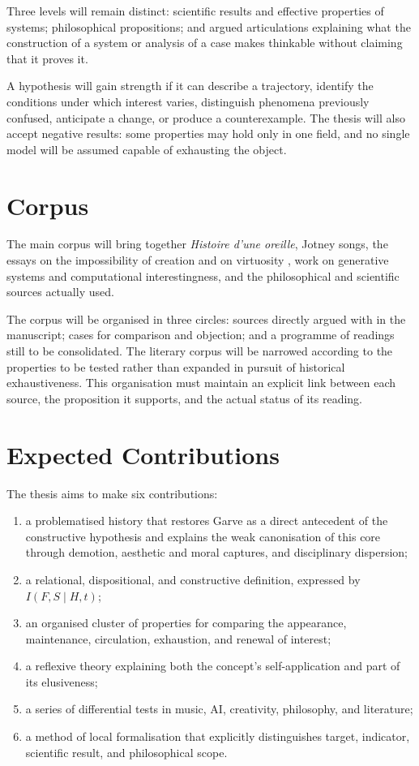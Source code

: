 \documentclass[11pt,a4paper]{article}
\begin{document}
Three levels will remain distinct: scientific results and effective properties
of systems; philosophical propositions; and argued articulations explaining
what the construction of a system or analysis of a case makes thinkable without
claiming that it proves it.

A hypothesis will gain strength if it can describe a trajectory, identify the
conditions under which interest varies, distinguish phenomena previously
confused, anticipate a change, or produce a counterexample. The thesis will also
accept negative results: some properties may hold only in one field, and no
single model will be assumed capable of exhausting the object.

\section{Corpus}

The main corpus will bring together \emph{Histoire d'une oreille}, Jotney songs,
the essays on the impossibility of creation and on virtuosity
\parencite{pachet2018oreille,pachet2026impossibilite,pachet2027virtuosite}, work
on generative systems and computational interestingness, and the philosophical
and scientific sources actually used.

The corpus will be organised in three circles: sources directly argued with in
the manuscript; cases for comparison and objection; and a programme of readings
still to be consolidated. The literary corpus will be narrowed according to the
properties to be tested rather than expanded in pursuit of historical
exhaustiveness. This organisation must maintain an explicit link between each
source, the proposition it supports, and the actual status of its reading.

\section{Expected Contributions}

The thesis aims to make six contributions:

\begin{enumerate}
  \item a problematised history that restores Garve as a direct antecedent of
        the constructive hypothesis and explains the weak canonisation of this
        core through demotion, aesthetic and moral captures, and disciplinary
        dispersion;
  \item a relational, dispositional, and constructive definition, expressed by
        \(I(F,S\mid H,t)\);
  \item an organised cluster of properties for comparing the appearance,
        maintenance, circulation, exhaustion, and renewal of interest;
  \item a reflexive theory explaining both the concept's self-application and
        part of its elusiveness;
  \item a series of differential tests in music, AI, creativity, philosophy,
        and literature;
  \item a method of local formalisation that explicitly distinguishes target,
        indicator, scientific result, and philosophical scope.
\end{enumerate}
\end{document}
